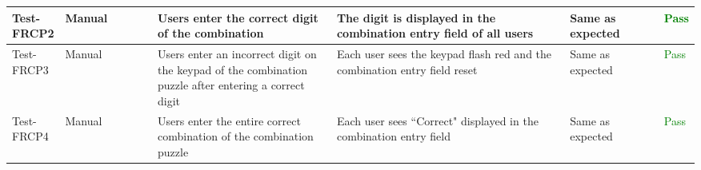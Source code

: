 \documentclass[12pt, titlepage]{article}
\begin{document}
\begin{table}[H]
{\begin{tabular}{|l|p{0.15\linewidth}|p{0.3\linewidth}|p{0.4\linewidth}|p{0.3\linewidth}|p{0.1\linewidth}|}
\hline
Test-FRCP2 & Manual & Users enter the correct digit of the combination & The digit is displayed in the combination entry field of all users & Same as expected & \textcolor{Green}{Pass} \\
\hline
Test-FRCP3 & Manual & Users enter an incorrect digit on the keypad of the combination puzzle after entering a correct digit & Each user sees the keypad flash red and the combination entry field reset & Same as expected & \textcolor{Green}{Pass} \\
\hline
Test-FRCP4 & Manual & Users enter the entire correct combination of the combination puzzle & Each user sees ``Correct" displayed in the combination entry field & Same as expected & \textcolor{Green}{Pass} \\
\hline
\end{tabular}}
\label{table:IP1}
\end{table}
\end{document}
